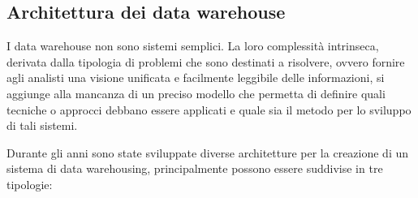\subsection{Architettura dei data warehouse}

I data warehouse non sono sistemi semplici. La loro complessità intrinseca, derivata dalla tipologia di problemi che sono destinati a risolvere, ovvero fornire agli analisti una visione unificata e facilmente leggibile delle informazioni, si aggiunge alla mancanza di un preciso modello che permetta di definire quali tecniche o approcci debbano essere applicati e quale sia il metodo per lo sviluppo di tali sistemi.\cite{kelly_data_warehousing_in_action}

Durante gli anni sono state sviluppate diverse architetture per la creazione di un sistema di data warehousing, principalmente possono essere suddivise in tre tipologie:\cite{interviewbit_data_warehouse_architecture}

